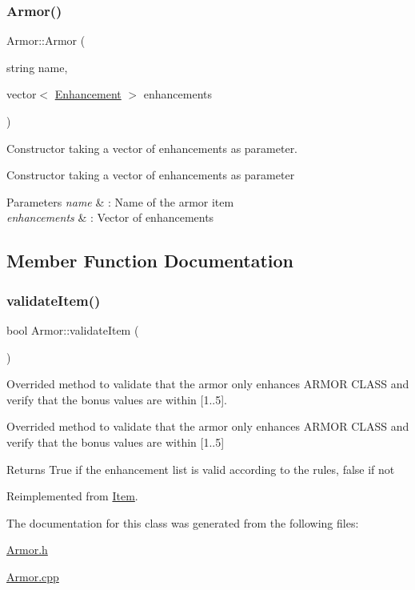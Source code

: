 \subsubsection{\texorpdfstring{Armor()}{Armor()}\hspace{0.1cm}{\footnotesize\ttfamily [2/2]}}
{\footnotesize\ttfamily Armor\+::\+Armor (\begin{DoxyParamCaption}\item[{string}]{name,  }\item[{vector$<$ \hyperlink{class_enhancement}{Enhancement} $>$}]{enhancements }\end{DoxyParamCaption})}



Constructor taking a vector of enhancements as parameter. 

Constructor taking a vector of enhancements as parameter 
\begin{DoxyParams}{Parameters}
{\em name} & \+: Name of the armor item \\
\hline
{\em enhancements} & \+: Vector of enhancements \\
\hline
\end{DoxyParams}


\subsection{Member Function Documentation}
\hypertarget{class_armor_a97b69f2691b172bd79e256a487a7f204}{}\label{class_armor_a97b69f2691b172bd79e256a487a7f204} 
\subsubsection{\texorpdfstring{validate\+Item()}{validateItem()}}
{\footnotesize\ttfamily bool Armor\+::validate\+Item (\begin{DoxyParamCaption}{ }\end{DoxyParamCaption})\hspace{0.3cm}{\ttfamily [virtual]}}



Overrided method to validate that the armor only enhances \textquotesingle{}A\+R\+M\+OR C\+L\+A\+SS\textquotesingle{} and verify that the bonus values are within \mbox{[}1..5\mbox{]}. 

Overrided method to validate that the armor only enhances \textquotesingle{}A\+R\+M\+OR C\+L\+A\+SS\textquotesingle{} and verify that the bonus values are within \mbox{[}1..5\mbox{]} \begin{DoxyReturn}{Returns}
True if the enhancement list is valid according to the rules, false if not 
\end{DoxyReturn}


Reimplemented from \hyperlink{class_item_a6603371b60aaded48f697975c81fc25b}{Item}.



The documentation for this class was generated from the following files\+:\begin{DoxyCompactItemize}
\item 
\hyperlink{_armor_8h}{Armor.\+h}\item 
\hyperlink{_armor_8cpp}{Armor.\+cpp}\end{DoxyCompactItemize}
